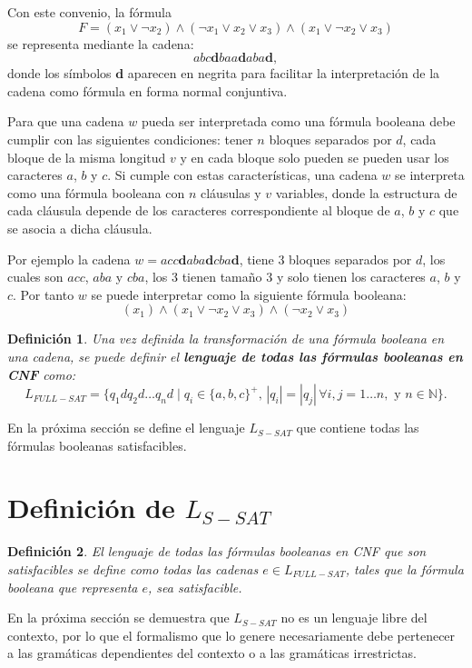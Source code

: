 \documentclass[12pt]{article}
\newtheorem{definition}{Definición}
\begin{document}
Con este convenio, la fórmula
$$ F=(x_1 \vee \neg x_2) \wedge (\neg x_1 \vee x_2 \vee x_3) \wedge (x_1 \vee \neg x_2 \vee x_3)$$
se representa mediante la cadena:
$$abc\mathbf{d}baa\mathbf{d}aba\mathbf{d},$$
donde los símbolos $\mathbf{d}$ aparecen en negrita para facilitar la interpretación de la cadena como fórmula 
en forma normal conjuntiva.

Para que una cadena $w$ pueda ser interpretada como una fórmula booleana debe cumplir con las siguientes condiciones:
tener $n$ bloques separados por $d$, cada bloque de la misma longitud $v$ y en cada bloque solo pueden se pueden usar los caracteres
$a$, $b$ y $c$.  Si cumple con estas características, una cadena $w$ se interpreta como una fórmula booleana con $n$ cláusulas y $v$ variables, donde la estructura de cada cláusula depende de los caracteres correspondiente al bloque de $a$, $b$ y $c$ que se asocia a dicha cláusula.

Por ejemplo la cadena $w=acc\mathbf{d}aba\mathbf{d}cba\mathbf{d}$, tiene 3 bloques separados por $d$, los cuales son $acc$, $aba$ y $cba$, los 3 tienen tamaño 3 y solo tienen los caracteres $a$, $b$ y $c$.
Por tanto  $w$ se puede interpretar como la siguiente fórmula booleana:
$$(x_1)\wedge(x_1\vee \neg x_2 \vee x_3) \wedge (\neg x_2\vee x_3)$$

\begin{definition}
    Una vez definida la transformación de una fórmula booleana en una cadena, se puede definir el \textbf{lenguaje de todas las fórmulas booleanas en CNF} como:
    \[
        L_{FULL-SAT} = \{ q_1dq_2d\dots q_nd \mid q_i \in \{a, b,c\}^+\text{, }
        |q_i| = |q_j| \, \forall i, j =1\dots n, \text{ y } n\in \mathbb{N}\}.
    \]
\end{definition}

En la próxima sección se define el lenguaje $L_{S-SAT}$ que contiene todas las fórmulas booleanas satisfacibles.

\section{Definición de $L_{S-SAT}$}

\begin{definition}
    El lenguaje de todas las fórmulas booleanas en CNF que son satisfacibles se define como todas las cadenas $e\in L_{FULL-SAT}$,
    tales que la fórmula booleana que representa $e$, sea satisfacible.
\end{definition}


En la próxima sección se demuestra que $L_{S-SAT}$ no es un lenguaje libre del contexto, por lo que el formalismo que lo
genere necesariamente debe pertenecer a las gramáticas dependientes del contexto o a las gramáticas irrestrictas.
\end{document}
